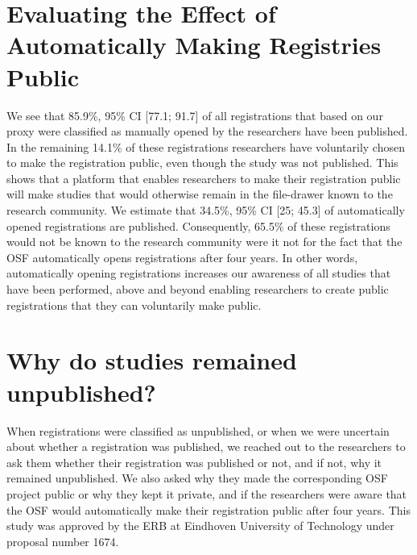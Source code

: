\documentclass[
  ,jou, a4paper,floatsintext]{apa6}
\begin{document}
\hypertarget{evaluating-the-effect-of-automatically-making-registries-public}{%
\section{Evaluating the Effect of Automatically Making Registries Public}\label{evaluating-the-effect-of-automatically-making-registries-public}}

We see that 85.9\%, 95\% CI {[}77.1; 91.7{]} of all registrations that based on our proxy were classified as manually opened by the researchers have been published. In the remaining 14.1\% of these registrations researchers have voluntarily chosen to make the registration public, even though the study was not published. This shows that a platform that enables researchers to make their registration public will make studies that would otherwise remain in the file-drawer known to the research community. We estimate that 34.5\%, 95\% CI {[}25; 45.3{]} of automatically opened registrations are published. Consequently, 65.5\% of these registrations would not be known to the research community were it not for the fact that the OSF automatically opens registrations after four years. In other words, automatically opening registrations increases our awareness of all studies that have been performed, above and beyond enabling researchers to create public registrations that they can voluntarily make public.

\hypertarget{why-do-studies-remained-unpublished}{%
\section{Why do studies remained unpublished?}\label{why-do-studies-remained-unpublished}}

When registrations were classified as unpublished, or when we were uncertain about whether a registration was published, we reached out to the researchers to ask them whether their registration was published or not, and if not, why it remained unpublished. We also asked why they made the corresponding OSF project public or why they kept it private, and if the researchers were aware that the OSF would automatically make their registration public after four years. This study was approved by the ERB at Eindhoven University of Technology under proposal number 1674.
\end{document}
